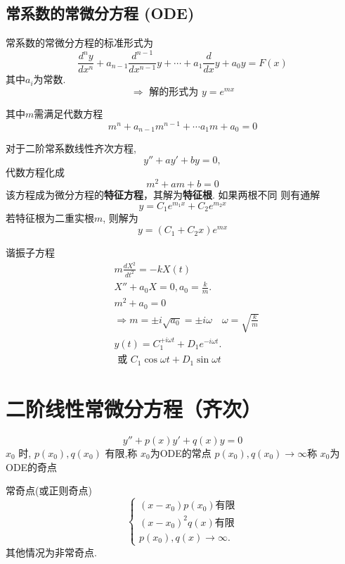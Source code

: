 \subsection{ 常系数的常微分方程 (ODE)}
常系数的常微分方程的标准形式为
\begin{equation}
\frac{d^n y}{d x^n}+a_{n-1}\frac{d^{n-1} }{d x^{n-1}} y  + \cdots +a_{1} \frac{d}{d x} y+a_0 y=F(x)
\end{equation}
其中$a_i$为常数.
$$
\Rightarrow \text { 解的形式为 } y=e^{m x}
$$

其中$m$需满足代数方程
$$
m^n+a_{n-1} m^{n-1}+\cdots a_1 m+a_0=0
$$

对于二阶常系数线性齐次方程, $$
y'' + a y' + by = 0,
$$
代数方程化成
\begin{equation}
    m^2 + a m + b = 0
\end{equation}
该方程成为微分方程的\textbf{特征方程}，其解为\textbf{特征根}. 如果两根不同
则有通解
\begin{equation}
    y = C_1 e^{m_1 x} +  C_2 e^{m_2 x} 
\end{equation}
若特征根为二重实根$m$, 则解为 
\begin{equation}
    y = (C_1 + C_2  x) e^{m x}
\end{equation}
\begin{example}
    谐振子方程
$$
\begin{aligned}
& m \frac{d X^2}{d t^2}=-k X(t) \\
& X''+a_0 X=0, a_0=\frac{k}{m} . \\
& m^2+a_0=0 \\
& \Rightarrow m= \pm i \sqrt{a_0}= \pm i \omega \quad \omega=\sqrt{\frac{k}{m}} \\
& y(t)=C_1 ^{+i \omega t}+D_{1} e^{-i \omega t} . \\
& \text { 或 } C_1 \cos \omega t+D_1 \sin \omega t
\end{aligned}
$$
\end{example}


\section{二阶线性常微分方程（齐次）}
$$
y''+p(x) y '+q(x) y=0
$$
$x_0$ 时, $p\left(x_0\right), q\left(x_0\right)$ 有限,称 $x_0$为ODE的常点
$p\left(x_0\right), q\left(x_0\right) \rightarrow \infty$称 $x_0$为ODE的奇点

常奇点(或正则奇点) $$\left\{\begin{array}{l}
    \left(x-x_0\right) p\left(x_0\right) \text{有限}
    \\
    \left(x-x_0\right)^2 q(x) \text{有限}
    \\ p\left(x_0\right), q(x) \rightarrow \infty .\end{array}
    \right.$$
其他情况为非常奇点.


